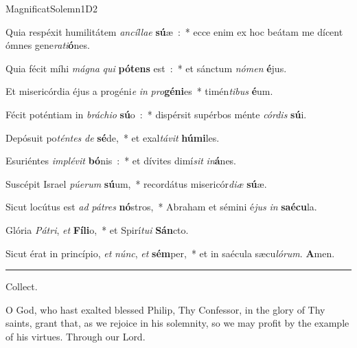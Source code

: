 \documentclass[letterpaper,12pt]{article} %
\begin{document}
{\greblockcustos{}
\begin{magnificat}{MagnificatSolemn1D2}
\normalsize
\item \vspace{-3ex} Quia respéxit humilitátem \emph{an}\emph{cíl}\emph{lae} \textbf{sú}æ~:~* ecce enim ex hoc beátam me dícent ómnes gene\emph{ra}\emph{ti}\textbf{ó}nes.
\item Quia fécit míhi \emph{má}\emph{gna} \emph{qui} \textbf{pó}\textbf{tens} est~:~* et sánctum \emph{nó}\emph{men} \textbf{é}jus.
\item Et misericórdia éjus a progéni\emph{e} \emph{in} \emph{pro}\textbf{gé}\textbf{ni}es~* timén\emph{ti}\emph{bus} \textbf{é}um.
\item Fécit poténtiam in \emph{brá}\emph{chi}\emph{o} \textbf{sú}o~:~* dispérsit supérbos ménte \emph{cór}\emph{dis} \textbf{sú}i.
\item Depósuit po\emph{tén}\emph{tes} \emph{de} \textbf{sé}de,~* et exal\emph{tá}\emph{vit} \textbf{hú}\textbf{mi}les.
\item Esuriéntes \emph{im}\emph{plé}\emph{vit} \textbf{bó}nis~:~* et dívites dimí\emph{sit} \emph{in}\textbf{á}nes.
\item Suscépit Israel \emph{pú}\emph{e}\emph{rum} \textbf{sú}um,~* recordátus misericór\emph{di}\emph{æ} \textbf{sú}æ.
\item Sicut locútus est \emph{ad} \emph{pá}\emph{tres} \textbf{nó}stros,~* Abraham et sémini é\emph{jus} \emph{in} \textbf{saé}\textbf{cu}la.
\item Glória \emph{Pá}\emph{tri}, \emph{et} \textbf{Fí}\textbf{li}o,~* et Spirí\emph{tu}\emph{i} \textbf{Sán}cto.
\item Sicut érat in princípio, \emph{et} \emph{núnc}, \emph{et} \textbf{sém}per,~* et in saécula sæcu\emph{ló}\emph{rum}. \textbf{A}men.
\end{magnificat}
}
\hrule
\smallskip
\begin{center}{\large Collect.}\end{center}
\begin{parcolumns}[rulebetween]{2}
\sloppy
{}
{O God, who hast exalted blessed Philip, Thy Confessor, in the glory of Thy saints, grant that, as we rejoice in his solemnity, so we may profit by the example of his virtues. Through our Lord.}
\end{parcolumns}
\bigskip
\end{document}
